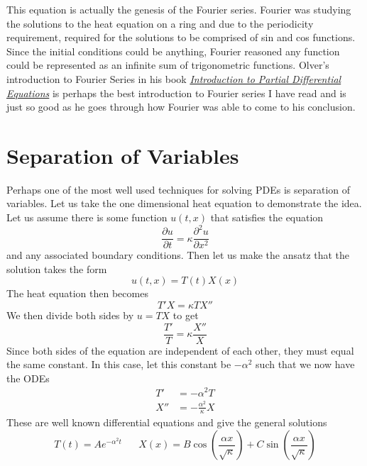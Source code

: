 \documentclass{report}
\theoremstyle{definition}
\theoremstyle{remark}
\newcommand{\twen}{\hspace{20pt}}
\newcommand{\pd}[2]{\frac{\partial #1}{\partial#2}}
\newcommand{\pdt}[2]{\frac{\partial^2 #1}{\partial#2^2}}
\begin{document}
This equation is actually the genesis of the Fourier series. Fourier was studying the solutions to the heat equation on a ring and due to the periodicity requirement, required for the solutions to be comprised of sin and cos functions. Since the initial conditions could be anything, Fourier reasoned any function could be represented as an infinite sum of trigonometric functions. Olver's introduction to Fourier Series in his book \href{https://link.springer.com/book/10.1007/978-3-319-02099-0}{\textit{Introduction to Partial Differential Equations}} is perhaps the best introduction to Fourier series I have read and is just so good as he goes through how Fourier was able to come to his conclusion. 
\section{Separation of Variables}
Perhaps one of the most well used techniques for solving PDEs is separation of variables. Let us take the one dimensional heat equation to demonstrate the idea. Let us assume there is some function $u(t,x)$ that satisfies the equation 
\begin{equation*}
    \pd{u}{t} = \kappa \pdt{u}{x}
\end{equation*}
and any associated boundary conditions. Then let us make the ansatz that the solution takes the form 
\begin{equation*}
    u(t,x)=T(t)X(x)
\end{equation*}
The heat equation then becomes 
\begin{equation*}
    T'X=\kappa TX''
\end{equation*}
We then divide both sides by $u=TX$ to get 
\begin{equation*}
    \frac{T'}{T} = \kappa \frac{X''}{X}
\end{equation*}
Since both sides of the equation are independent of each other, they must equal the same constant. In this case, let this constant be $-\alpha^2$ such that we now have the ODEs 
\begin{equation*}
    \begin{split}
        T' &=-\alpha^2T \\
        X''&=-\frac{\alpha^2}{\kappa}X
    \end{split}
\end{equation*}
These are well known differential equations and give the general solutions 
\begin{equation*}
    T(t)=Ae^{-\alpha^2t} \twen X(x) =B\cos\left( \frac{\alpha x}{\sqrt \kappa}\right) +C\sin\left( \frac{\alpha x}{\sqrt \kappa}\right)
\end{equation*}
\end{document}
